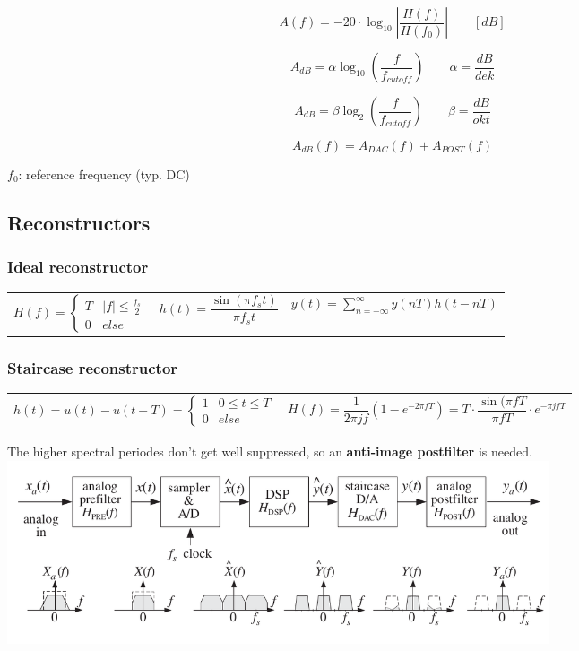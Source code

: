 \[ A(f) = -20 \cdot \log_{10}{\left|\frac{H(f)}{H(f_0)}\right|} \qquad [dB] \]

\[ A_{dB} = \alpha \log_{10}(\frac{f}{f_{cutoff}}) \qquad \alpha = \frac{dB}{dek} \]

\[ A_{dB} = \beta \log_{2}(\frac{f}{f_{cutoff}}) \qquad \beta = \frac{dB}{okt} \]

\[ A_{dB}(f) = A_{DAC}(f) + A_{POST}(f) \]

$f_0$: reference frequency (typ. DC)

\subsection{Reconstructors }
\subsubsection{Ideal reconstructor }
  \begin{tabular}{p{5cm}p{4cm}p{6cm}}
	  $H(f) = \left\lbrace \begin{matrix}
	    T & |f| \leq \frac{f_s}{2} \\
	    0 & else
	  \end{matrix}\right.$ & 
    $h(t) = \dfrac{\sin(\pi f_s t)}{\pi f_s t}$ &
    $y(t) = \sum\limits_{n=-\infty}^\infty y(nT)h(t-nT)$
  \end{tabular}
  

\subsubsection{Staircase reconstructor }
  \begin{tabular}{p{8cm}p{8cm}}
    $h(t) = u(t) - u(t-T) = \left\lbrace \begin{matrix}
      1 & 0\leq t \leq T \\
      0 & else
    \end{matrix}\right.$ &
    $H(f) = \dfrac{1}{2\pi j f}(1-e^{-2\pi f T}) = T \cdot \dfrac{\sin(\pi f T}{\pi f T}\cdot e^{-\pi j f T}$
  \end{tabular}
  
  The higher spectral periodes don't get well suppressed, so an \textbf{anti-image postfilter} is needed.\\
  \includegraphics[width=16cm]{./picture/compOfDSPSystem}
  

  
  
